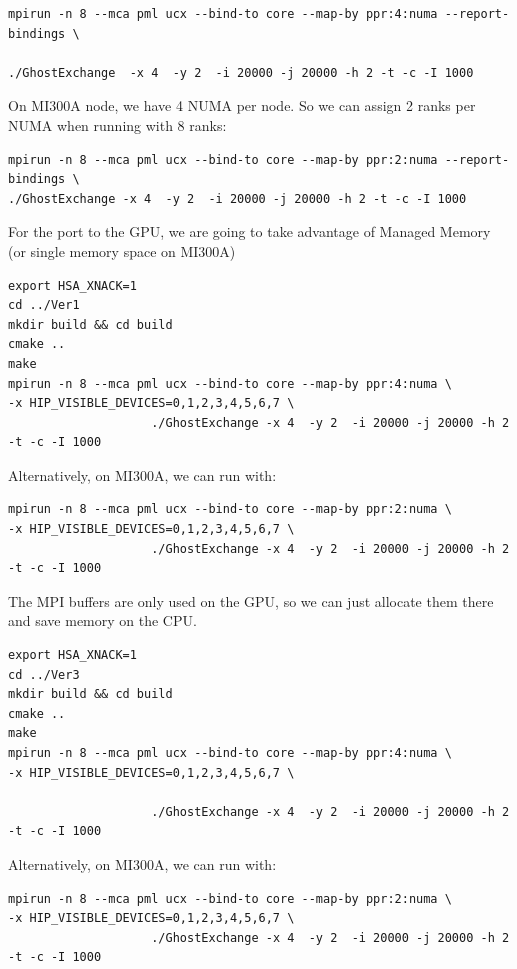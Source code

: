 \documentclass[
]{article}
\begin{document}
\begin{verbatim}
mpirun -n 8 --mca pml ucx --bind-to core --map-by ppr:4:numa --report-bindings \

./GhostExchange  -x 4  -y 2  -i 20000 -j 20000 -h 2 -t -c -I 1000
\end{verbatim}

On MI300A node, we have 4 NUMA per node. So we can assign 2 ranks per
NUMA when running with 8 ranks:

\begin{verbatim}
mpirun -n 8 --mca pml ucx --bind-to core --map-by ppr:2:numa --report-bindings \
./GhostExchange -x 4  -y 2  -i 20000 -j 20000 -h 2 -t -c -I 1000
\end{verbatim}

For the port to the GPU, we are going to take advantage of Managed
Memory (or single memory space on MI300A)

\begin{verbatim}
export HSA_XNACK=1
cd ../Ver1
mkdir build && cd build
cmake ..
make
mpirun -n 8 --mca pml ucx --bind-to core --map-by ppr:4:numa \
-x HIP_VISIBLE_DEVICES=0,1,2,3,4,5,6,7 \ 
                    ./GhostExchange -x 4  -y 2  -i 20000 -j 20000 -h 2 -t -c -I 1000
\end{verbatim}

Alternatively, on MI300A, we can run with:

\begin{verbatim}
mpirun -n 8 --mca pml ucx --bind-to core --map-by ppr:2:numa \
-x HIP_VISIBLE_DEVICES=0,1,2,3,4,5,6,7 \
                    ./GhostExchange -x 4  -y 2  -i 20000 -j 20000 -h 2 -t -c -I 1000
\end{verbatim}

The MPI buffers are only used on the GPU, so we can just allocate them
there and save memory on the CPU.

\begin{verbatim}
export HSA_XNACK=1
cd ../Ver3
mkdir build && cd build
cmake ..
make
mpirun -n 8 --mca pml ucx --bind-to core --map-by ppr:4:numa \
-x HIP_VISIBLE_DEVICES=0,1,2,3,4,5,6,7 \ 

                    ./GhostExchange -x 4  -y 2  -i 20000 -j 20000 -h 2 -t -c -I 1000
\end{verbatim}

Alternatively, on MI300A, we can run with:

\begin{verbatim}
mpirun -n 8 --mca pml ucx --bind-to core --map-by ppr:2:numa \
-x HIP_VISIBLE_DEVICES=0,1,2,3,4,5,6,7 \
                    ./GhostExchange -x 4  -y 2  -i 20000 -j 20000 -h 2 -t -c -I 1000
\end{verbatim}
\end{document}
